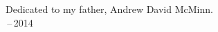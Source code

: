 
\thispagestyle{empty}

\vspace*{3cm}

\begin{center}
Dedicated to my father, Andrew David McMinn. \\ \,--\,2014
\end{center}